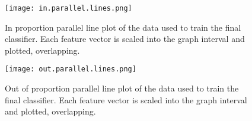 \begin{figure}
    \texttt{[image: in.parallel.lines.png]}
    \centering
    \caption{In proportion parallel line plot of the data used to train the final classifier. Each feature vector is scaled into the graph interval and plotted, overlapping.}
    \label{fig:inparline}
\end{figure}

\begin{figure}
    \texttt{[image: out.parallel.lines.png]}   
    \centering
    \caption{Out of proportion parallel line plot of the data used to train the final classifier. Each feature vector is scaled into the graph interval and plotted, overlapping.}
    \label{fig:outparline}
\end{figure}

%
%
%

